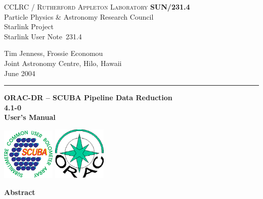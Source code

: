 \documentclass[twoside,11pt]{article}
\newcommand{\stardoccategory}  {Starlink User Note}
\newcommand{\stardocinitials}  {SUN}
\newcommand{\stardocnumber}    {231.4}
\newcommand{\stardocauthors}   {Tim Jenness, Frossie Economou\\
Joint Astronomy Centre, Hilo, Hawaii}
\newcommand{\stardocdate}      {June 2004}
\newcommand{\stardoctitle}     {ORAC-DR -- SCUBA Pipeline Data Reduction}
\newcommand{\stardocversion}   {4.1-0}
\newcommand{\stardocmanual}    {User's Manual}
\newcommand{\stardocname}{\stardocinitials /\stardocnumber}
\newenvironment{latexonly}{}{}
\renewcommand{\_}{\texttt{\symbol{95}}}
\begin{document}
\thispagestyle{empty}

\begin{latexonly}
   CCLRC / \textsc{Rutherford Appleton Laboratory} \hfill \textbf{\stardocname}\\
   {\large Particle Physics \& Astronomy Research Council}\\
   {\large Starlink Project\\}
   {\large \stardoccategory\ \stardocnumber}
   \begin{flushright}
   \stardocauthors\\
   \stardocdate
   \end{flushright}
   \vspace{-4mm}
   \rule{\textwidth}{0.5mm}
   \vspace{5mm}
   \begin{center}
   {\Huge\textbf{\stardoctitle \\ [2.5ex]}}
   {\LARGE\textbf{\stardocversion \\ [4ex]}}
   {\Huge\textbf{\stardocmanual}}
   \end{center}
   \vspace{5mm}

\begin{center}
\includegraphics[width=1.0in]{sun231_sculogo.eps}
\hskip 1.0in
\includegraphics[width=1.0in]{sun231_logo.eps}
\end{center}

   \vspace{10mm}
   \begin{center}
      {\Large\textbf{Abstract}}
   \end{center}
\end{latexonly}
\end{document}
